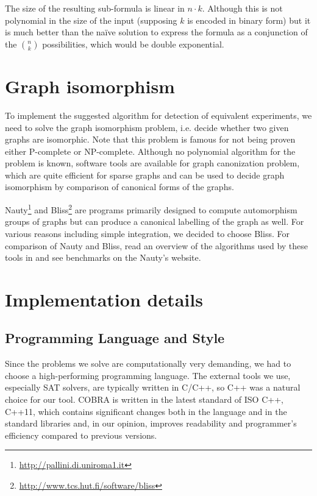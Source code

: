 The size of the resulting sub-formula is linear in $n\cdot k$.
Although this is not polynomial in the size of the input
  (supposing $k$ is encoded in binary form) but it is much better
  than the na\"ive solution to express the formula
  as a conjunction of the $n\choose k$ possibilities,
  which would be double exponential.

\section{Graph isomorphism}

To implement the suggested algorithm for detection of equivalent experiments,
  we need to solve the graph isomorphism problem, i.e. decide whether
  two given graphs are isomorphic.
Note that this problem is famous for not being proven either P-complete or
  NP-complete.
Although no polynomial algorithm for the problem is known,
  software tools are available for graph canonization problem,
  which are quite efficient for sparse graphs and can be used to
  decide graph isomorphism by comparison of canonical forms of the graphs.

Nauty\footnote{\url{http://pallini.di.uniroma1.it}}\cite{nauty} and
  Bliss\footnote{\url{http://www.tcs.hut.fi/software/bliss}}\cite{bliss}
  are programs primarily designed to compute automorphism groups of graphs
  but can produce a canonical labelling of the graph as well.
For various reasons including simple integration, we decided to choose Bliss.
For comparison of Nauty and Bliss,
  read an overview of the algorithms used by these tools in \cite{nautyblissoverview}
  and see benchmarks on the Nauty's website.

\section{Implementation details}

\subsection{Programming Language and Style}

Since the problems we solve are computationally very demanding,
  we had to choose a high-performing programming language.
The external tools we use, especially SAT solvers, are typically written in C/C++,
  so C++ was a natural choice for our tool.
COBRA is written in the latest standard of ISO C++, C++11, which
  contains significant changes both in the language and in the standard libraries
  and, in our opinion, improves readability and programmer's efficiency
  compared to previous versions.

